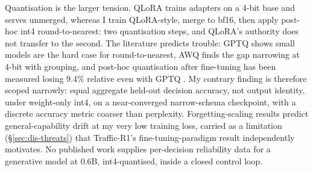 Quantisation is the larger tension. QLoRA trains adapters on a 4-bit base and serves unmerged, whereas I train QLoRA-style, merge to bf16, then apply post-hoc int4 round-to-nearest: two quantisation steps, and QLoRA's authority does not transfer to the second. The literature predicts trouble: GPTQ \cite{frantar2022gptq} shows small models are the hard case for round-to-nearest, AWQ \cite{lin2023awq} finds the gap narrowing at 4-bit with grouping, and post-hoc quantisation after fine-tuning has been measured losing 9.4\% relative even with GPTQ \cite{quantlora2024}. My contrary finding is therefore scoped narrowly: equal aggregate held-out decision accuracy, not output identity, under weight-only int4, on a near-converged narrow-schema checkpoint, with a discrete accuracy metric coarser than perplexity. Forgetting-scaling results \cite{forgetting2024} predict general-capability drift at my very low training loss, carried as a limitation (\S\ref{sec:dis-threats}) that Traffic-R1's fine-tuning-paradigm result independently motivates. No published work supplies per-decision reliability data for a generative model at 0.6B, int4-quantised, inside a closed control loop.
